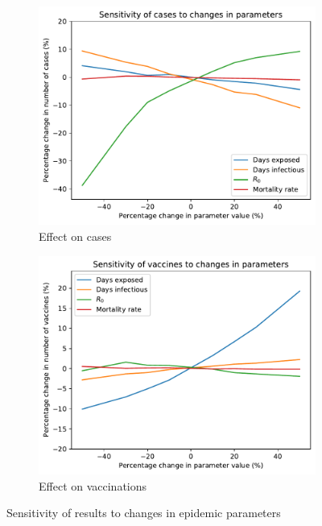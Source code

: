 \documentclass[10pt,letterpaper]{article}
\begin{document}
\begin{figure}[ht!]
  \begin{subfigure}[b]{0.5\textwidth}
    \includegraphics[width=\textwidth]{figures/sensitivity/epidemic_param_cases.pdf}
    \caption{Effect on cases}
    \label{fig:sens_epi_cases}
  \end{subfigure}
  \begin{subfigure}[b]{0.5\textwidth}
    \includegraphics[width=\textwidth]{figures/sensitivity/epidemic_param_vaccines.pdf}
    \caption{Effect on vaccinations}
    \label{fig:sens_epi_vaccs}
  \end{subfigure}
  \caption{Sensitivity of results to changes in epidemic parameters}
\end{figure}
\end{document}

